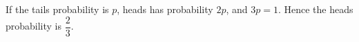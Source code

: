If the tails probability is $p$, heads has probability $2p$, and $3p=1$. Hence the heads probability is $\boxed{\dfrac{2}{3}}$.
